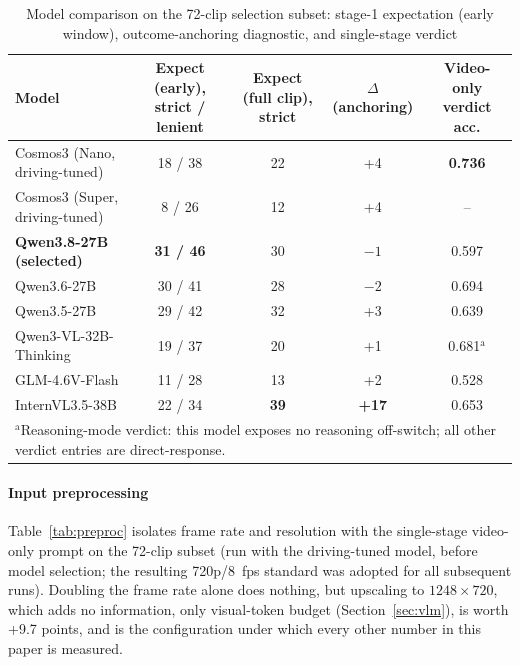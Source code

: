 \documentclass[conference]{IEEEtran}
\begin{document}
\begin{table}[htbp]
\caption{Model comparison on the 72-clip selection subset: stage-1 expectation (early window), outcome-anchoring diagnostic, and single-stage verdict}
\begin{center}
\footnotesize
\begin{tabular}{|l|c|c|c|c|}
\hline
\textbf{Model} & \textbf{Expect (early), strict / lenient} & \textbf{Expect (full clip), strict} & \textbf{$\Delta$ (anchoring)} & \textbf{Video-only verdict acc.} \\
\hline
Cosmos3 (Nano, driving-tuned) \cite{b11,b30} & 18 / 38 & 22 & +4 & \textbf{0.736} \\
\hline
Cosmos3 (Super, driving-tuned) & 8 / 26 & 12 & +4 & -- \\
\hline
\textbf{Qwen3.8-27B (selected)} & \textbf{31 / 46} & 30 & $-1$ & 0.597 \\
\hline
Qwen3.6-27B & 30 / 41 & 28 & $-2$ & 0.694 \\
\hline
Qwen3.5-27B & 29 / 42 & 32 & +3 & 0.639 \\
\hline
Qwen3-VL-32B-Thinking & 19 / 37 & 20 & +1 & 0.681$^{\mathrm{a}}$ \\
\hline
GLM-4.6V-Flash & 11 / 28 & 13 & +2 & 0.528 \\
\hline
InternVL3.5-38B & 22 / 34 & \textbf{39} & \textbf{+17} & 0.653 \\
\hline
\multicolumn{5}{l}{$^{\mathrm{a}}$Reasoning-mode verdict: this model exposes no reasoning off-switch; all other verdict entries are direct-response.}
\end{tabular}
\label{tab:models}
\end{center}
\end{table}

\paragraph{Input preprocessing} Table~\ref{tab:preproc} isolates frame rate and resolution with the single-stage video-only prompt on the 72-clip subset (run with the driving-tuned model, before model selection; the resulting 720p/8~fps standard was adopted for all subsequent runs). Doubling the frame rate alone does nothing, but upscaling to $1248\times720$, which adds no information, only visual-token budget (Section~\ref{sec:vlm}), is worth +9.7 points, and is the configuration under which every other number in this paper is measured.
\end{document}
